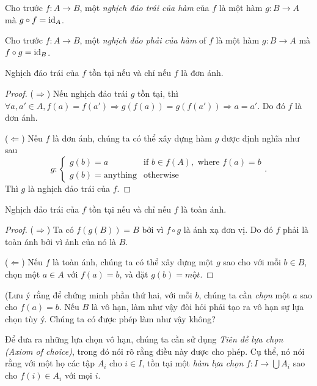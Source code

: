 \begin{defi}
  Cho trước $f: A\to B$, một \emph{nghịch đảo trái của hàm} của $f$ là một hàm $g:B\to A$ mà $g\circ f = \operatorname{id} _A$.
\end{defi}

\begin{defi}
  Cho trước $f: A\to B$, một \emph{nghịch đảo phải của hàm} of $f$ là một hàm $g:B\to A$ mà $f\circ g = \operatorname{id} _B$.
\end{defi}

\begin{thm}
  Nghịch đảo trái của $f$ tồn tại nếu và chỉ nếu $f$ là đơn ánh.
\end{thm}

\begin{proof}
  ($\Rightarrow$)
  Nếu nghịch đảo trái $g$ tồn tại, thì $\forall a, a'\in A, f(a) = f(a') \Rightarrow g( f(a))=g(f(a'))\Rightarrow a=a'$. Do đó $f$ là đơn ánh.

  ($\Leftarrow$) Nếu $f$ là đơn ánh, chúng ta có thể xây dựng hàm $g$ được định nghĩa như sau
  \[
    g: \begin{cases}
      g(b) = a &\text{if }b\in f(A), \text{ where }f(a) = b\\
      g(b) = \text{anything} & \text{otherwise}
    \end{cases}.
  \]
  Thì $g$ là nghịch đảo trái của $f$.
\end{proof}

\begin{thm}
  Nghịch đảo trái của $f$ tồn tại nếu và chỉ nếu $f$ là toàn ánh.
\end{thm}

\begin{proof}
  ($\Rightarrow$) Ta có $f(g(B)) = B$ bởi vì $f\circ g$ là ánh xạ đơn vị. Do đó $f$ phải là toàn ánh bởi vì ảnh của nó là $B$.

  ($\Leftarrow$) Nếu $f$ là toàn ánh, chúng ta có thể xây dựng một $g$ sao cho với mỗi $b\in B$, chọn một $a\in A$ với $f(a) = b$, và đặt $g(b) = một$.
\end{proof}

(Lưu ý rằng để chứng minh phần thứ hai, với mỗi $b$, chúng ta cần \emph{chọn} một $a$ sao cho $f(a) = b$. Nếu $B$ là vô hạn, làm như vậy đòi hỏi phải tạo ra vô hạn sự lựa chọn tùy ý. Chúng ta có được phép làm như vậy không?

Để đưa ra những lựa chọn vô hạn, chúng ta cần sử dụng \emph{Tiên đề lựa chọn (Axiom of choice)}, trong đó nói rõ rằng điều này được cho phép. Cụ thể, nó nói rằng với một họ các tập $A_i$ cho $i \in I$, tồn tại một \emph{hàm lựa chọn} $f: I \to \bigcup A_i$ sao cho $f(i)\in A_i$ với mọi $i$.

